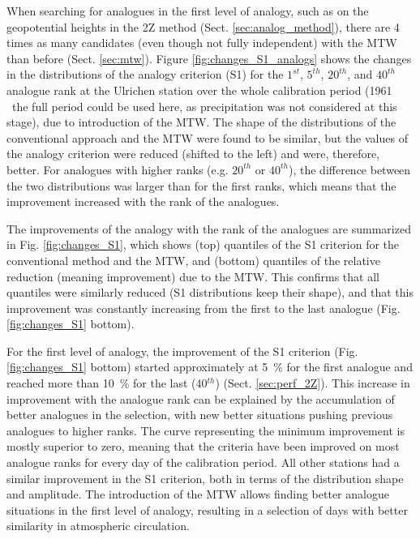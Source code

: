 \documentclass[hess, manuscript]{copernicus}
\begin{document}
	When searching for analogues in the first level of analogy, such as on the geopotential heights in the 2Z method (Sect. \ref{sec:analog_method}), there are 4 times as many candidates (even though not fully independent) with the MTW than before (Sect. \ref{sec:mtw}). Figure \ref{fig:changes_S1_analogs} shows the changes in the distributions of the analogy criterion (S1) for the $1^{st}$, $5^{th}$, $20^{th}$, and $40^{th}$ analogue rank at the Ulrichen station over the whole calibration period (1961 \textendash\ the full period could be used here, as precipitation was not considered at this stage), due to introduction of the MTW. The shape of the distributions of the conventional approach and the MTW were found to be similar, but the values of the analogy criterion were reduced (shifted to the left) and were, therefore, better. For analogues with higher ranks (e.g. $20^{th}$ or $40^{th}$), the difference between the two distributions was larger than for the first ranks, which means that the improvement increased with the rank of the analogues. 
	
	The improvements of the analogy with the rank of the analogues are summarized in Fig. \ref{fig:changes_S1}, which shows (top) quantiles of the S1 criterion for the conventional method and the MTW, and (bottom) quantiles of the relative reduction (meaning improvement) due to the MTW. This confirms that all quantiles were similarly reduced (S1 distributions keep their shape), and that this improvement was constantly increasing from the first to the last analogue (Fig. \ref{fig:changes_S1} bottom).
	
	
	For the first level of analogy, the improvement of the S1 criterion (Fig. \ref{fig:changes_S1} bottom) started approximately at 5~\% for the first analogue and reached more than 10~\% for the last (40$^{th}$) (Sect. \ref{sec:perf_2Z}). This increase in improvement with the analogue rank can be explained by the accumulation of better analogues in the selection, with new better situations pushing previous analogues to higher ranks. The curve representing the minimum improvement is mostly superior to zero, meaning that the criteria have been improved on most analogue ranks for every day of the calibration period. All other stations had a similar improvement in the S1 criterion, both in terms of the distribution shape and amplitude. The introduction of the MTW allows finding better analogue situations in the first level of analogy, resulting in a selection of days with better similarity in atmospheric circulation.
	
\end{document}
